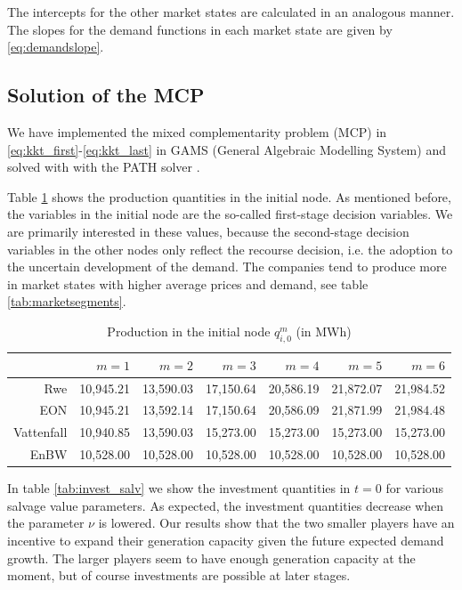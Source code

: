 The intercepts for the other market states are calculated in an analogous manner. The slopes for the demand functions in each market state are given by \eqref{eq:demandslope}.

\subsection{Solution of the MCP}

We have implemented the mixed complementarity problem (MCP) in \eqref{eq:kkt_first}-\eqref{eq:kkt_last} in GAMS (General Algebraic Modelling System) and solved with with the PATH solver \citep[see][]{Ferris2000}.

Table \ref{tab:prod_init} shows the production quantities in the initial node. As mentioned before, the variables in the initial node are the so-called first-stage decision variables. We are primarily interested in these values, because the second-stage decision variables in the other nodes only reflect the recourse decision, i.e. the adoption to the uncertain development of the demand. The companies tend to produce more in market states with higher average prices and demand, see table \ref{tab:marketsegments}. 

\begin{table}[htb]
  \centering
  \caption{Production in the initial node $q_{i,0}^{m}$ (in MWh)}
  \label{tab:prod_init}
  \vspace{0.3cm}
  \begin{tabular}{rrrrrrr}
\hline
           &     $m=1$ &     $m=2$ &     $m=3$ &     $m=4$ &     $m=5$ &     $m=6$ \\
\hline\hline
       Rwe &    10,945.21  &    13,590.03  &    17,150.64  &    20,586.19  &    21,872.07  &    21,984.52  \\

       EON &    10,945.21  &    13,592.14  &    17,150.64  &    20,586.09  &    21,871.99  &    21,984.48  \\

    Vattenfall &    10,940.85  &    13,590.03  &    15,273.00  &    15,273.00  &    15,273.00  &    15,273.00  \\

      EnBW &    10,528.00  &    10,528.00  &    10,528.00  &    10,528.00  &    10,528.00  &    10,528.00  \\
\hline
  \end{tabular}
\end{table}

In table \ref{tab:invest_salv} we show the investment quantities in $t=0$ for various salvage value parameters. As expected, the investment quantities decrease when the parameter $\nu$ is lowered. Our results show that the two smaller players have an incentive to expand their generation capacity given the future expected demand growth. The larger players seem to have enough generation capacity at the moment, but of course investments are possible at later stages.

